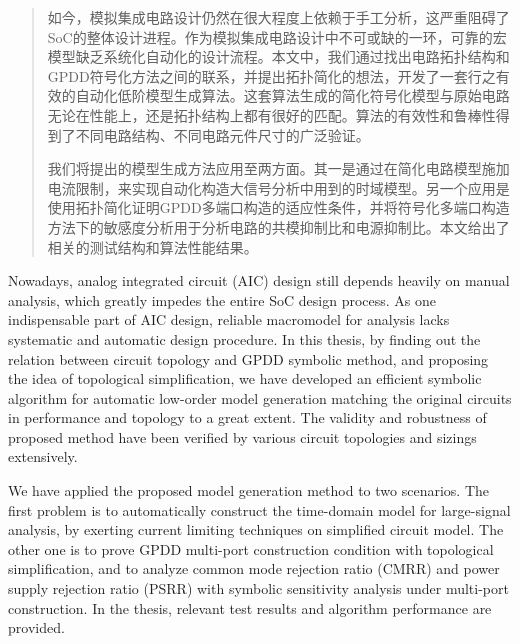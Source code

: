 
\begin{abstract}

如今，模拟集成电路设计仍然在很大程度上依赖于手工分析，这严重阻碍了SoC的整体设计进程。作为模拟集成电路设计中不可或缺的一环，可靠的宏模型缺乏系统化自动化的设计流程。本文中，我们通过找出电路拓扑结构和GPDD符号化方法之间的联系，并提出拓扑简化的想法，开发了一套行之有效的自动化低阶模型生成算法。这套算法生成的简化符号化模型与原始电路无论在性能上，还是拓扑结构上都有很好的匹配。算法的有效性和鲁棒性得到了不同电路结构、不同电路元件尺寸的广泛验证。

我们将提出的模型生成方法应用至两方面。其一是通过在简化电路模型施加电流限制，来实现自动化构造大信号分析中用到的时域模型。另一个应用是使用拓扑简化证明GPDD多端口构造的适应性条件，并将符号化多端口构造方法下的敏感度分析用于分析电路的共模抑制比和电源抑制比。本文给出了相关的测试结构和算法性能结果。

\end{abstract}

\begin{englishabstract}

Nowadays, analog integrated circuit (AIC) design still depends heavily on manual analysis, which greatly impedes the entire SoC design process. As one indispensable part of AIC design, reliable macromodel for analysis lacks systematic and automatic design procedure. In this thesis, by finding out the relation between circuit topology and GPDD symbolic method, and proposing the idea of topological simplification, we have developed an efficient symbolic algorithm for automatic low-order model generation matching the original circuits in performance and topology to a great extent. The validity and robustness of proposed method have been verified by various circuit topologies and sizings extensively.

We have applied the proposed model generation method to two scenarios. The first problem is to automatically construct the time-domain model for large-signal analysis, by exerting current limiting techniques on simplified circuit model. The other one is to prove GPDD multi-port construction condition with topological simplification, and to analyze common mode rejection ratio (CMRR) and power supply rejection ratio (PSRR) with symbolic sensitivity analysis under multi-port construction. In the thesis, relevant test results and algorithm performance are provided.


\end{englishabstract}

